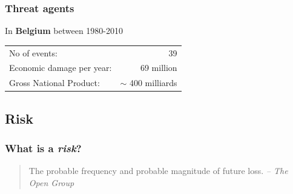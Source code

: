 \begin{frame}
\frametitle{Threat agents}
\pause
\begin{exampleblock}{In {\bfseries Belgium} between 1980-2010}
\begin{center}
\begin{tabular}{lr}
No of events: & 39 \\
Economic damage per year: & 69 million \\
Gross National Product: & $\sim$ 400 milliards \\
\end{tabular}
\end{center}
\end{exampleblock}
\end{frame}

\subsection{Risk}

\begin{frame}
\frametitle{What is a \emph{risk}?}
\begin{quote}
The probable {\Large frequency} and probable {\Large magnitude} of {\Large
future loss}.
\textit{-- The Open Group}
\end{quote}
\end{frame}

